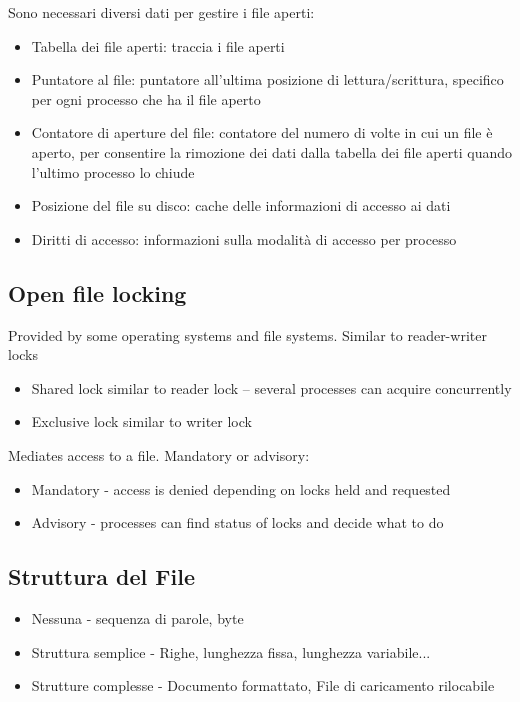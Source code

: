 Sono necessari diversi dati per gestire i file aperti:
\begin{itemize}
  \item Tabella dei file aperti: traccia i file aperti
  \item Puntatore al file: puntatore all'ultima posizione di lettura/scrittura, specifico per ogni processo che ha il file aperto
  \item Contatore di aperture del file: contatore del numero di volte in cui un file è aperto, per consentire la rimozione dei dati dalla tabella dei file aperti quando l'ultimo processo lo chiude
  \item Posizione del file su disco: cache delle informazioni di accesso ai dati
  \item Diritti di accesso: informazioni sulla modalità di accesso per processo
\end{itemize}

\subsection{Open file locking}

Provided by some operating systems and ﬁle systems. Similar to reader-writer locks

\begin{itemize}
  \item Shared lock similar to reader lock -- several processes can acquire concurrently
  \item Exclusive lock similar to writer lock
\end{itemize}

Mediates access to a ﬁle. Mandatory or advisory:

\begin{itemize}
  \item  Mandatory - access is denied depending on locks held and requested
  \item  Advisory - processes can ﬁnd status of locks and decide what to do
\end{itemize}


\subsection{Struttura del File}

\begin{itemize}
  \item Nessuna - sequenza di parole, byte
  \item Struttura semplice - Righe, lunghezza fissa, lunghezza variabile...
  \item Strutture complesse - Documento formattato, File di caricamento rilocabile
\end{itemize}

